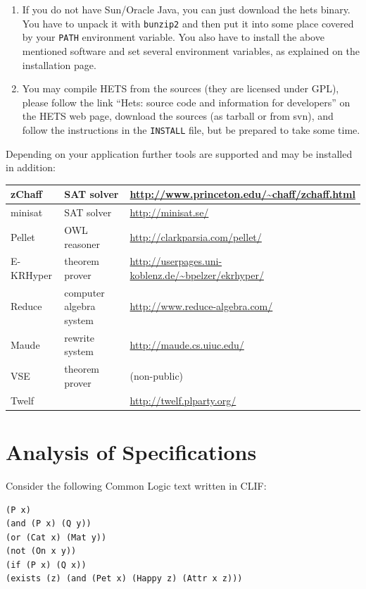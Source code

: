 \documentclass{article}
\newcommand{\normalTEXTSC}[2]{{#1\scriptsize#2}}
\newcommand     {\Hets}{\normalTEXTSC{H}{ETS}\xspace}
\begin{document}
\begin{enumerate}
\item
If you do not have Sun/Oracle Java, you can just download the hets binary.
You have to unpack it with \texttt{bunzip2} and then put it into
some place covered by your \texttt{PATH} environment variable. You also have to
install the above mentioned software and set
several environment variables, as explained on the installation page.

\item
You may compile \Hets from the sources (they are licensed under GPL), 
please follow the
link ``Hets: source code and information for developers''
on the \Hets web page, download the sources (as tarball or from
svn), and follow the
instructions in the \texttt{INSTALL} file, but be prepared to take some time.
\end{enumerate}

Depending on your application further tools are supported and may be
installed in addition:

\medskip
{\small
\begin{tabularx}{\linewidth}{|l|l|X|}\hline
zChaff & SAT solver & \url{http://www.princeton.edu/~chaff/zchaff.html} \\\hline
minisat & SAT solver & \url{http://minisat.se/} \\\hline
Pellet & OWL reasoner & \url{http://clarkparsia.com/pellet/} \\\hline
E-KRHyper & theorem prover
  & \url{http://userpages.uni-koblenz.de/~bpelzer/ekrhyper/} \\\hline
Reduce & computer algebra system
  & \url{http://www.reduce-algebra.com/} \\\hline
Maude & rewrite system & \url{http://maude.cs.uiuc.edu/} \\\hline
VSE & theorem prover & (non-public) \\\hline
Twelf & & \url{http://twelf.plparty.org/} \\\hline
\end{tabularx}
}

\section{Analysis of Specifications}
Consider the following Common Logic text written in CLIF:

\medskip
\begin{lstlisting}[language=clif]
(P x)
(and (P x) (Q y))
(or (Cat x) (Mat y))
(not (On x y))
(if (P x) (Q x))
(exists (z) (and (Pet x) (Happy z) (Attr x z)))
\end{lstlisting}
\end{document}
